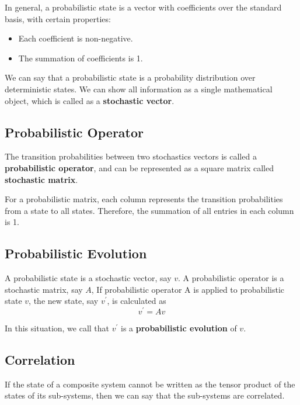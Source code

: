 In general, a probabilistic state is a vector with coefficients over the standard basis, with certain properties:
\begin{itemize}
	\item Each coefficient is non-negative.
	\item The summation of coefficients is 1.
\end{itemize}

\begin{definition}
We can say that a probabilistic state is a probability distribution over deterministic states.
We can show all information as a single mathematical object, which is called as a \textbf{stochastic vector}.
\end{definition}

\subsection{Probabilistic Operator}

\begin{definition}
The transition probabilities between two stochastics vectors is called a \textbf{probabilistic operator}, and can be represented as a square matrix called \textbf{stochastic matrix}.
\end{definition}

For a probabilistic matrix, each column represents the transition probabilities from a state to all states.
Therefore, the summation of all entries in each column is 1.

\subsection{Probabilistic Evolution}
A probabilistic state is a stochastic vector, say $v$.
A probabilistic operator is a stochastic matrix, say $A$,
If probabilistic operator A is applied to probabilistic state $v$, the new state, say $v^\prime$, is calculated as
\begin{equation*}
v^\prime=Av
\end{equation*}
\begin{definition}
In this situation, we call that $v^\prime$ is a \textbf{probabilistic evolution} of $v$.
\end{definition}

\subsection{Correlation}
If the state of a composite system cannot be written as the tensor product of the states of its sub-systems, then we can say that the sub-systems are correlated.